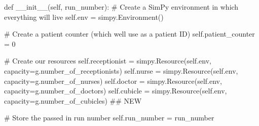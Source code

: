 \documentclass[
  letterpaper,
  DIV=11,
  numbers=noendperiod]{scrreprt}
\newenvironment{Shaded}{\begin{snugshade}}{\end{snugshade}}
\newcommand{\CommentTok}[1]{\textcolor[rgb]{0.37,0.37,0.37}{#1}}
\newcommand{\DecValTok}[1]{\textcolor[rgb]{0.68,0.00,0.00}{#1}}
\newcommand{\FunctionTok}[1]{\textcolor[rgb]{0.28,0.35,0.67}{#1}}
\newcommand{\KeywordTok}[1]{\textcolor[rgb]{0.00,0.23,0.31}{#1}}
\newcommand{\NormalTok}[1]{\textcolor[rgb]{0.00,0.23,0.31}{#1}}
\newcommand{\OperatorTok}[1]{\textcolor[rgb]{0.37,0.37,0.37}{#1}}
\newcommand{\VariableTok}[1]{\textcolor[rgb]{0.07,0.07,0.07}{#1}}
\begin{document}
\begin{Shaded}
\begin{Highlighting}[]
\KeywordTok{def} \FunctionTok{\_\_init\_\_}\NormalTok{(}\VariableTok{self}\NormalTok{, run\_number):}
        \CommentTok{\# Create a SimPy environment in which everything will live}
        \VariableTok{self}\NormalTok{.env }\OperatorTok{=}\NormalTok{ simpy.Environment()}

        \CommentTok{\# Create a patient counter (which we\textquotesingle{}ll use as a patient ID)}
        \VariableTok{self}\NormalTok{.patient\_counter }\OperatorTok{=} \DecValTok{0}

        \CommentTok{\# Create our resources}
        \VariableTok{self}\NormalTok{.receptionist }\OperatorTok{=}\NormalTok{ simpy.Resource(}\VariableTok{self}\NormalTok{.env, capacity}\OperatorTok{=}\NormalTok{g.number\_of\_receptionists)}
        \VariableTok{self}\NormalTok{.nurse }\OperatorTok{=}\NormalTok{ simpy.Resource(}\VariableTok{self}\NormalTok{.env, capacity}\OperatorTok{=}\NormalTok{g.number\_of\_nurses)}
        \VariableTok{self}\NormalTok{.doctor }\OperatorTok{=}\NormalTok{ simpy.Resource(}\VariableTok{self}\NormalTok{.env, capacity}\OperatorTok{=}\NormalTok{g.number\_of\_doctors)}
        \VariableTok{self}\NormalTok{.cubicle }\OperatorTok{=}\NormalTok{ simpy.Resource(}\VariableTok{self}\NormalTok{.env, capacity}\OperatorTok{=}\NormalTok{g.number\_of\_cubicles) }\CommentTok{\#\# NEW}

        \CommentTok{\# Store the passed in run number}
        \VariableTok{self}\NormalTok{.run\_number }\OperatorTok{=}\NormalTok{ run\_number}


\end{Highlighting}
\end{Shaded}
\end{document}
